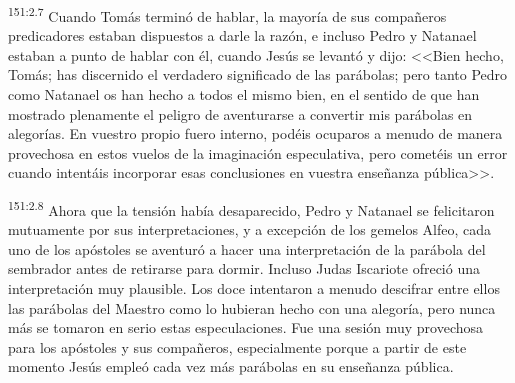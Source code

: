\par 
\textsuperscript{151:2.7} Cuando Tomás terminó de hablar, la mayoría de sus compañeros predicadores estaban dispuestos a darle la razón, e incluso Pedro y Natanael estaban a punto de hablar con él, cuando Jesús se levantó y dijo: <<Bien hecho, Tomás; has discernido el verdadero significado de las parábolas; pero tanto Pedro como Natanael os han hecho a todos el mismo bien, en el sentido de que han mostrado plenamente el peligro de aventurarse a convertir mis parábolas en alegorías. En vuestro propio fuero interno, podéis ocuparos a menudo de manera provechosa en estos vuelos de la imaginación especulativa, pero cometéis un error cuando intentáis incorporar esas conclusiones en vuestra enseñanza pública>>.

\par 
\textsuperscript{151:2.8} Ahora que la tensión había desaparecido, Pedro y Natanael se felicitaron mutuamente por sus interpretaciones, y a excepción de los gemelos Alfeo, cada uno de los apóstoles se aventuró a hacer una interpretación de la parábola del sembrador antes de retirarse para dormir. Incluso Judas Iscariote ofreció una interpretación muy plausible. Los doce intentaron a menudo descifrar entre ellos las parábolas del Maestro como lo hubieran hecho con una alegoría, pero nunca más se tomaron en serio estas especulaciones. Fue una sesión muy provechosa para los apóstoles y sus compañeros, especialmente porque a partir de este momento Jesús empleó cada vez más parábolas en su enseñanza pública.

